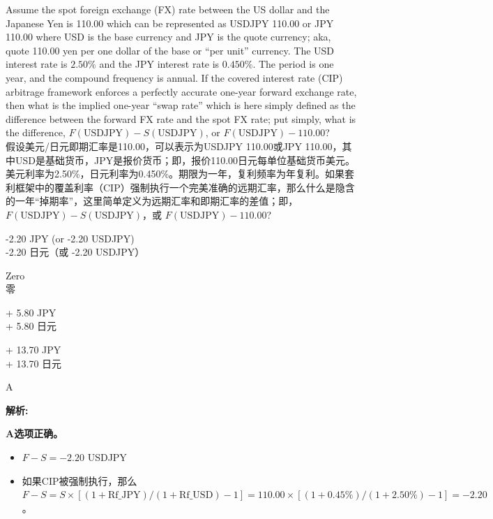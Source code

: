 \documentclass{article}
\newcounter{question} %
\newenvironment{explanation}
{\textbf{解析:}\par}
{\par}
\begin{document}
  \begin{question}
      Assume the spot foreign exchange (FX) rate between the US dollar and the Japanese Yen is 110.00 which can be represented as USDJPY 110.00 or JPY 110.00 where USD is the base currency and JPY is the quote currency; aka, quote 110.00 yen per one dollar of the base or “per unit” currency. The USD interest rate is $2.50\%$ and the JPY interest rate is $0.450\%$. The period is one year, and the compound frequency is annual. If the covered interest rate (CIP) arbitrage framework enforces a perfectly accurate one-year forward exchange rate, then what is the implied one-year “swap rate” which is here simply defined as the difference between the forward FX rate and the spot FX rate; put simply, what is the difference, $F(\text{USDJPY}) - S(\text{USDJPY})$, or $F(\text{USDJPY}) - 110.00$?\\
      假设美元/日元即期汇率是110.00，可以表示为USDJPY 110.00或JPY 110.00，其中USD是基础货币，JPY是报价货币；即，报价110.00日元每单位基础货币美元。美元利率为2.50\%，日元利率为0.450\%。期限为一年，复利频率为年复利。如果套利框架中的覆盖利率（CIP）强制执行一个完美准确的远期汇率，那么什么是隐含的一年“掉期率”，这里简单定义为远期汇率和即期汇率的差值；即，$F(\text{USDJPY}) - S(\text{USDJPY})$，或 $F(\text{USDJPY}) - 110.00$?
  \end{question}
  
  \begin{choices}
      \item -2.20 JPY (or -2.20 USDJPY)
      \\-2.20 日元（或 -2.20 USDJPY）
      \item Zero
      \\零
      \item + 5.80 JPY
      \\+ 5.80 日元
      \item + 13.70 JPY
      \\+ 13.70 日元
  \end{choices}
  
  \begin{correctanswer}
      A
  \end{correctanswer}
  
  \begin{explanation}
      \textbf{A选项正确。} 
      \begin{itemize}
          \item  $F - S = -2.20$ USDJPY
      
          \item 如果CIP被强制执行，那么 $F - S = S \times [(1 + \text{Rf\_JPY})/(1 + \text{Rf\_USD}) - 1] = 110.00 \times [(1 + 0.45\%)/(1 + 2.50\%) - 1] = -2.20$。
      \end{itemize}
  \end{explanation}
  
\end{document}
